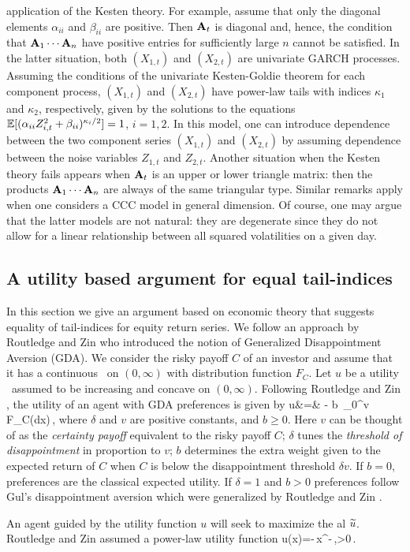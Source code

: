 application of the Kesten theory. For example, assume that only the
diagonal elements $\alpha_{ii}$ and $\beta_{ii}$ are positive.
Then ${\bf A}_t$ is diagonal and, hence, the condition that
${\bf A}_1\cdots{\bf A}_n$ have positive entries for sufficiently large $n$ 
cannot be satisfied. In the latter situation, both $(X_{1,t})$ and
$(X_{2,t})$ are univariate GARCH processes. Assuming the 
conditions of the univariate Kesten-Goldie theorem for each component
process, $(X_{1,t})$ and $(X_{2,t})$ have power-law tails 
with indices $\kappa_1$ and $\kappa_2$, respectively,  given by the solutions to the equations 
$\mathbb{E} [(\alpha_{ii} Z_{i,t}^2+\beta_{ii})^{\kappa_i/2}]=1$, $i=1,2$. In
this model, one can introduce dependence between the two component
series $(X_{1,t})$ and $(X_{2,t})$ by assuming dependence between the
noise variables $Z_{1,t}$ and $Z_{2,t}$. Another situation when the
Kesten theory fails 
appears when ${\bf A}_t$ is an upper or lower triangle matrix: then the
products  ${\bf A}_1\cdots{\bf A}_n$ are always of the same triangular
type. 
Similar remarks apply when one considers a CCC model in general
dimension. Of course, one may argue that the latter models 
are not natural: they are degenerate since they do not allow 
for a linear relationship
between all squared volatilities on a given day. 

\subsection{A utility based argument for equal tail-indices}\label{sec:3}
In this section we give an argument based on economic theory that
suggests equality of  tail-indices for equity return series.
We follow an approach by Routledge and Zin
\cite{routledge2010generalized} who introduced the notion of
Generalized Disappointment Aversion (GDA). We consider the risky
payoff $C$ of an investor and assume that it has a continuous \ds\ on
$(0,\infty)$ with distribution function $F_C$. Let $u$ be a utility \fct\ assumed to be
increasing and concave on $(0,\infty)$.  Following Routledge and Zin
\cite{routledge2010generalized},
the utility of an agent with GDA preferences is given by
\beao%
  \wt u&=& \E [u(C)] - b\, \int_{0}^{\delta v}
   F_C(dx)\,,
\eeao
where $\delta $ and $v$ are positive constants, and $b\ge 0$.
  Here $v$ can be thought of as the {\em certainty payoff} equivalent to the
 risky payoff $C$; $\delta$ tunes the {\em threshold of 
   disappointment} in proportion to $v$; $b$ determines the extra
 weight given to the expected return of $C$ when $C$ is below the
 disappointment threshold $\delta v$.
 If $b=0$, preferences are the classical expected utility. If
 $\delta=1$ and $b>0$ preferences follow Gul's \cite{gul:1991} 
disappointment aversion which were generalized by Routledge and Zin
\cite{routledge2010generalized}.
\par
An agent guided by the utility function $u$ will seek to maximize the
\fct al $\widetilde u$.
Routledge and Zin assumed a power-law utility function 
\beam\label{eq:hjyr}
u(x)=-\,x^{-\xi}\,,\quad \xi>0\,. 
\eeam

